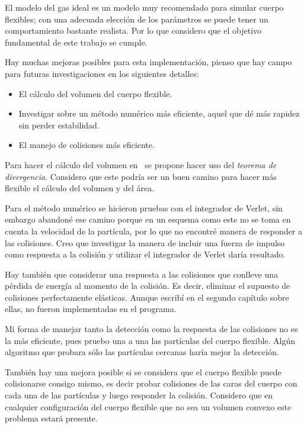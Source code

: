 El modelo del gas ideal es un modelo muy recomendado para simular cuerpo flexibles; con una adecuada elección de los parámetros se puede tener un comportamiento bastante realista. Por lo que considero que el objetivo fundamental de este trabajo se cumple.

Hay muchas mejoras posibles para esta implementación, pienso que hay campo para futuras investigaciones en los siguientes detalles:

\begin{itemize}
 \item El cálculo del volumen del cuerpo flexible.
 \item Investigar sobre un método numérico más eficiente, aquel que dé más rapidez sin perder estabilidad.
 \item El manejo de colisiones más eficiente.
\end{itemize}

Para hacer el cálculo del volumen en~\cite{Matika:SoftBody} se propone hacer uso del \emph{teorema de divergencia}. Considero que este podría ser un buen camino para hacer más flexible el cálculo del volumen y del área.

Para el método numérico se hicieron pruebas con el integrador de Verlet, sin embargo abandoné ese camino porque en un esquema como este no se toma en cuenta la velocidad de la partícula, por lo que no encontré manera de responder a las colisiones. Creo que investigar la manera de incluir una fuerza de impulso como respuesta a la colisión y utilizar el integrador de Verlet daría resultado.

Hay también que considerar una respuesta a las colisiones que conlleve una pérdida de energía al momento de la colisión. Es decir, eliminar el supuesto de colisiones perfectamente elásticas. Aunque escribí en el segundo capítulo sobre ellas, no fueron implementadas en el programa.

Mi forma de manejar tanto la detección como la respuesta de las colisiones  no es la más eficiente, pues pruebo una a una las partículas del cuerpo flexible. Algún algoritmo que probara sólo las partículas cercanas haría mejor la detección.

También hay una mejora posible si se considera que el cuerpo flexible puede colisionarse consigo mismo, es decir probar colisiones de las caras del cuerpo con cada una de las partículas y luego responder la colisión. Considero que en cualquier configuración del cuerpo flexible que no sea un volumen convexo este problema estará presente.
